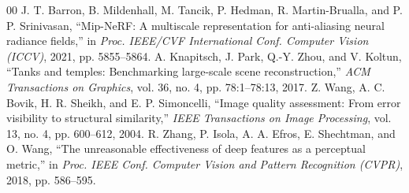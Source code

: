 \documentclass[conference]{IEEEtran}
\begin{document}
\begin{thebibliography}{00}
 J. T. Barron, B. Mildenhall, M. Tancik, P. Hedman, R. Martin-Brualla, and P. P. Srinivasan, ``Mip-NeRF: A multiscale representation for anti-aliasing neural radiance fields,'' in \textit{Proc. IEEE/CVF International Conf. Computer Vision (ICCV)}, 2021, pp. 5855--5864.
 A. Knapitsch, J. Park, Q.-Y. Zhou, and V. Koltun, ``Tanks and temples: Benchmarking large-scale scene reconstruction,'' \textit{ACM Transactions on Graphics}, vol. 36, no. 4, pp. 78:1--78:13, 2017.
 Z. Wang, A. C. Bovik, H. R. Sheikh, and E. P. Simoncelli, ``Image quality assessment: From error visibility to structural similarity,'' \textit{IEEE Transactions on Image Processing}, vol. 13, no. 4, pp. 600--612, 2004.
 R. Zhang, P. Isola, A. A. Efros, E. Shechtman, and O. Wang, ``The unreasonable effectiveness of deep features as a perceptual metric,'' in \textit{Proc. IEEE Conf. Computer Vision and Pattern Recognition (CVPR)}, 2018, pp. 586--595.
\end{thebibliography}
\end{document}
